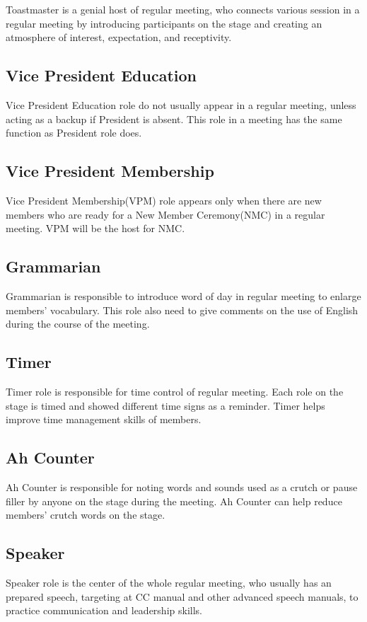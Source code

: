 Toastmaster is a genial host of regular meeting, who connects various 
session in a regular meeting by introducing participants on the stage 
and creating an atmosphere of interest, expectation, and receptivity.

\subsection{Vice President Education}

Vice President Education role do not usually appear in a regular meeting,
unless acting as a backup if President is absent. This role in a meeting
has the same function as President role does.

\subsection{Vice President Membership}

Vice President Membership(VPM) role appears only when there are new members 
who are ready for a New Member Ceremony(NMC) in a regular meeting. VPM will 
be the host for NMC.

\subsection{Grammarian}

Grammarian is responsible to introduce word of day in regular meeting to enlarge
members' vocabulary. This role also need to give comments on the use of English
during the course of the meeting.

\subsection{Timer}

Timer role is responsible for time control of regular meeting. Each role on
the stage is timed and showed different time signs as a reminder. Timer helps 
improve time management skills of members. 

\subsection{Ah Counter}
Ah Counter is responsible for noting words and sounds used as a crutch or 
pause filler by anyone on the stage during the meeting. Ah Counter can help 
reduce members' crutch words on the stage.

\subsection{Speaker}
Speaker role is the center of the whole regular meeting, who usually has an 
prepared speech, targeting at CC manual and other advanced speech manuals,
to practice communication and leadership skills.


